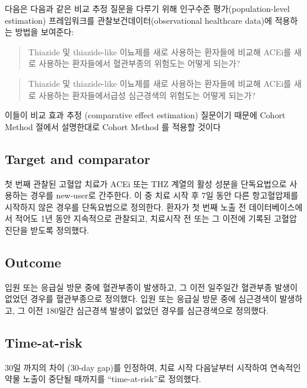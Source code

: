 \documentclass[]{book}
\begin{document}
다음은 다음과 같은 비교 추정 질문을 다루기 위해 인구수준 평가(population-level estimation) 프레임워크를 관찰보건데이터(observational healthcare data)에 적용하는 방법을 보여준다:

\begin{quote}
Thiazide 및 thiazide-like 이뇨제를 새로 사용하는 환자들에 비교해 ACEi를 새로 사용하는 환자들에서 혈관부종의 위험도는 어떻게 되는가?
\end{quote}

\begin{quote}
Thiazide 및 thiazide-like 이뇨제를 새로 사용하는 환자들에 비교해 ACEi를 새로 사용하는 환자들에서급성 심근경색의 위험도는 어떻게 되는가?
\end{quote}

이들이 비교 효과 추정 (comparative effect estimation) 질문이기 때문에 Cohort Method 절에서 설명한대로 Cohort Method 를 적용할 것이다

\hypertarget{target-and-comparator}{%
\subsection{Target and comparator}\label{target-and-comparator}}

첫 번째 관찰된 고혈압 치료가 ACEi 또는 THZ 계열의 활성 성분을 단독요법으로 사용하는 경우를 new-user로 간주한다. 이 중 치료 시작 후 7일 동안 다른 항고혈압제를 시작하지 않은 경우를 단독요법으로 정의한다. 환자가 첫 번째 노출 전 데이터베이스에서 적어도 1년 동안 지속적으로 관찰되고, 치료시작 전 또는 그 이전에 기록된 고혈압 진단을 받도록 정의했다.

\hypertarget{outcome}{%
\subsection{Outcome}\label{outcome}}

입원 또는 응급실 방문 중에 혈관부종이 발생하고, 그 이전 일주일간 혈관부종 발생이 없었던 경우를 혈관부종으로 정의했다. 입원 또는 응급실 방문 중에 심근경색이 발생하고, 그 이전 180일간 심근경색 발생이 없었던 경우를 심근경색으로 정의했다.

\hypertarget{time-at-risk}{%
\subsection{Time-at-risk}\label{time-at-risk}}

30일 까지의 차이 (30-day gap)를 인정하여, 치료 시작 다음날부터 시작하여 연속적인 약물 노출이 중단될 때까지를 ``time-at-risk''로 정의했다.
\end{document}
